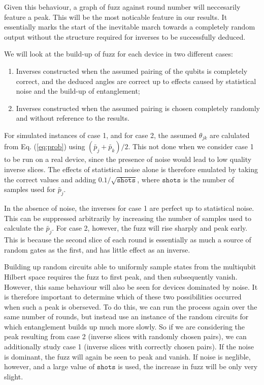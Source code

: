 \documentclass[aps,prl,twocolumn,showpacs,preprintnumbers]{revtex4-1}
\begin{document}
Given this behaviour, a graph of fuzz against round number will neccesarily feature a peak. This will be the most noticable feature in our results. It essentially marks the start of the inevitable march towards a completely random output without the structure required for inverses to be successfully deduced.

We will look at the build-up of fuzz for each device in two different cases:
\begin{enumerate}
\item Inverses constructed when the assumed pairing of the qubits is completely correct, and the deduced angles are correct up to effects caused by statistical noise and the build-up of entanglement;
\item Inverses constructed when the assumed pairing is chosen completely randomly and without reference to the results.
\end{enumerate}

For simulated instances of case 1, and for case 2, the assumed $\theta_{jk}$ are calulated from Eq. (\ref{eq:prob}) using $(\tilde{p_j}+\tilde{p_k})/2$. This not done when we consider case 1 to be run on a real device, since the presence of noise would lead to low quality inverse slices. The effects of statistical noise alone is therefore emulated by taking the correct values and adding $0.1/\sqrt{\mathtt{shots}}$, where $\mathtt{shots}$ is the number of samples used for $\tilde{p_j}$. 

In the absence of noise, the inverses for case 1 are perfect up to statistical noise. This can be suppressed arbitrarily by increasing the number of samples used to calculate the $\tilde{p_j}$. For case 2, however, the fuzz will rise sharply and peak early. This is because the second slice of each round is essentially as much a source of random gates as the first, and has little effect as an inverse.

Building up random circuits able to uniformly sample states from the multiqubit Hilbert space requires the fuzz to first peak, and then subsequently vanish. However, this same behaviour will also be seen for devices dominated by noise. It is therefore important to determine which of these two possibilities occurred when such a peak is oberseved. To do this, we can run the process again over the same number of rounds, but instead use an instance of the random circuits for which entanglement builds up much more slowly. So if we are considering the peak resulting from case 2 (inverse slices with randomly chosen pairs), we can additionally study case 1 (inverse slices with correctly chosen pairs). If the noise is dominant, the fuzz will again be seen to peak and vanish. If noise is neglible, however, and a large value of $\mathtt{shots}$ is used, the increase in fuzz will be only very slight.
\end{document}
